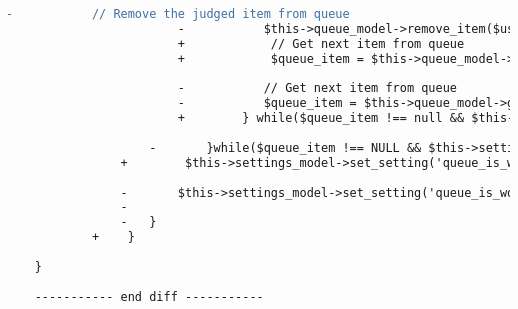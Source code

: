 \begin{lstlisting}[language=diff, caption=Perubahan pada kode Queueprocess.php]
						-			// Remove the judged item from queue
						-			$this->queue_model->remove_item($username, $assignment, $problem['id'], $submit_id);
						+            // Get next item from queue
						+            $queue_item = $this->queue_model->get_first_item();
						
						-			// Get next item from queue
						-			$queue_item = $this->queue_model->get_first_item();
						+        } while($queue_item !== null && $this->settings_model->get_setting('queue_is_working'));
					
					-		}while($queue_item !== NULL && $this->settings_model->get_setting('queue_is_working'));
				+        $this->settings_model->set_setting('queue_is_working', '0');
				
				-		$this->settings_model->set_setting('queue_is_working', '0');
				-
				-	}
			+    }
		
	}
	
	----------- end diff -----------
\end{lstlisting}

